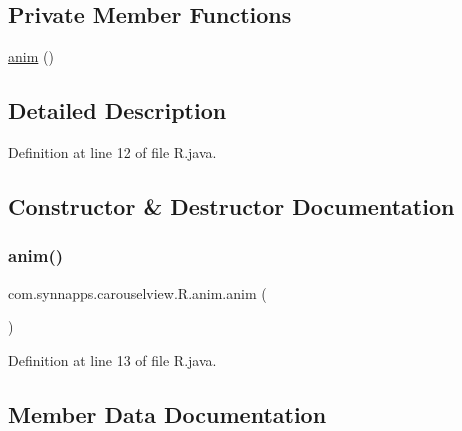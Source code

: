 \subsection*{Private Member Functions}
\begin{DoxyCompactItemize}
\item 
\mbox{\hyperlink{classcom_1_1synnapps_1_1carouselview_1_1_r_1_1anim_add40a62cec7666465f3ff1aa36a836f4}{anim}} ()
\end{DoxyCompactItemize}


\subsection{Detailed Description}


Definition at line 12 of file R.\+java.



\subsection{Constructor \& Destructor Documentation}
\mbox{\label{classcom_1_1synnapps_1_1carouselview_1_1_r_1_1anim_add40a62cec7666465f3ff1aa36a836f4}} 
\subsubsection{\texorpdfstring{anim()}{anim()}}
{\footnotesize\ttfamily com.\+synnapps.\+carouselview.\+R.\+anim.\+anim (\begin{DoxyParamCaption}{ }\end{DoxyParamCaption})\hspace{0.3cm}{\ttfamily [private]}}



Definition at line 13 of file R.\+java.


\begin{DoxyCode}{0}

\end{DoxyCode}


\subsection{Member Data Documentation}
\mbox{\label{classcom_1_1synnapps_1_1carouselview_1_1_r_1_1anim_a5bbdf51a26336e553745a3b69c5458f8}} 

